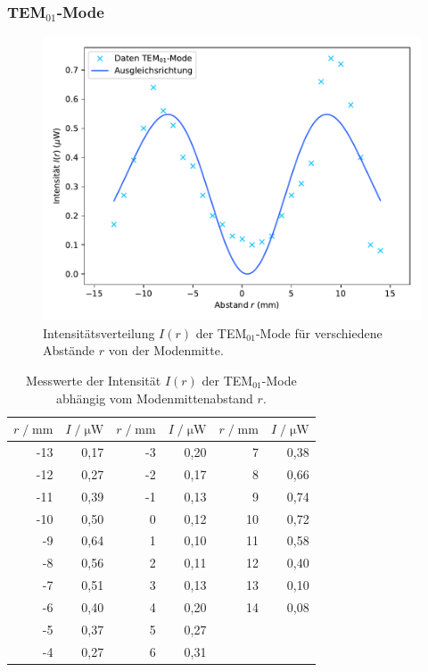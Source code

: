 \subsubsection{TEM$_{01}$-Mode}

\begin{figure}[H]
    \centering
    \includegraphics[scale=0.7]{content/TEM01.pdf}
    \vspace{-10pt}
    \caption{Intensitätsverteilung $I(r)$ der TEM$_{01}$-Mode für verschiedene Abstände $r$ von der Modenmitte.}
    \label{fig:TEM01}
\end{figure}

\begin{table}[H]
    \centering
    \caption{Messwerte der Intensität $I(r)$ der TEM$_{01}$-Mode abhängig vom Modenmittenabstand $r$.}
    \label{tab:TEM01}
    \begin{tabular}{r r | r r | r r}
    \toprule
    $r \;/\; \si{\milli\meter}$ & $I \;/\; \si{\micro\watt}$ & $r \;/\; \si{\milli\meter}$ & $I \;/\; \si{\micro\watt}$
    & $r \;/\; \si{\milli\meter}$ & $I \;/\; \si{\micro\watt}$ \\
    \midrule
        -13 & 0,17 & -3 & 0,20 &  7 & 0,38 \\
        -12 & 0,27 & -2 & 0,17 &  8 & 0,66 \\
        -11 & 0,39 & -1 & 0,13 &  9 & 0,74 \\
        -10 & 0,50 &  0 & 0,12 & 10 & 0,72 \\
         -9 & 0,64 &  1 & 0,10 & 11 & 0,58 \\
         -8 & 0,56 &  2 & 0,11 & 12 & 0,40 \\
         -7 & 0,51 &  3 & 0,13 & 13 & 0,10 \\
         -6 & 0,40 &  4 & 0,20 & 14 & 0,08 \\
         -5 & 0,37 &  5 & 0,27 \\
         -4 & 0,27 &  6 & 0,31 \\
    \bottomrule
    \end{tabular}
\end{table}

